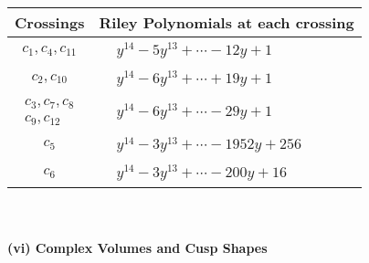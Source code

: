 \documentclass[1p]{elsarticle_modified}
\theoremstyle{definition}
\begin{document}
\begin{tabular}{m{50pt}|m{274pt}}
Crossings & \hspace{64pt}Riley Polynomials at each crossing \\
\hline $$\begin{aligned}c_{1},c_{4},c_{11}\end{aligned}$$&$\begin{aligned}
&y^{14}-5 y^{13}+\cdots-12 y+1
\end{aligned}$\\
\hline $$\begin{aligned}c_{2},c_{10}\end{aligned}$$&$\begin{aligned}
&y^{14}-6 y^{13}+\cdots+19 y+1
\end{aligned}$\\
\hline $$\begin{aligned}c_{3},c_{7},c_{8}\\c_{9},c_{12}\end{aligned}$$&$\begin{aligned}
&y^{14}-6 y^{13}+\cdots-29 y+1
\end{aligned}$\\
\hline $$\begin{aligned}c_{5}\end{aligned}$$&$\begin{aligned}
&y^{14}-3 y^{13}+\cdots-1952 y+256
\end{aligned}$\\
\hline $$\begin{aligned}c_{6}\end{aligned}$$&$\begin{aligned}
&y^{14}-3 y^{13}+\cdots-200 y+16
\end{aligned}$\\
\hline
\end{tabular}\\~\\
\newpage\flushleft \textbf{(vi) Complex Volumes and Cusp Shapes}
\end{document}
